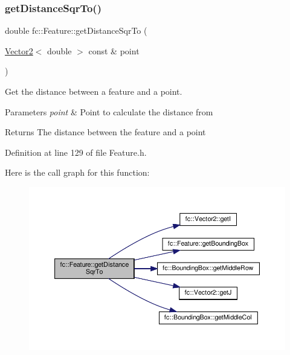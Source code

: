 \subsubsection{\texorpdfstring{get\+Distance\+Sqr\+To()}{getDistanceSqrTo()}}
{\footnotesize\ttfamily double fc\+::\+Feature\+::get\+Distance\+Sqr\+To (\begin{DoxyParamCaption}\item[{\hyperlink{classfc_1_1Vector2}{Vector2}$<$ double $>$ const \&}]{point }\end{DoxyParamCaption})\hspace{0.3cm}{\ttfamily [inline]}}



Get the distance between a feature and a point. 


\begin{DoxyParams}{Parameters}
{\em point} & Point to calculate the distance from \\
\hline
\end{DoxyParams}
\begin{DoxyReturn}{Returns}
The distance between the feature and a point 
\end{DoxyReturn}


Definition at line 129 of file Feature.\+h.

Here is the call graph for this function\+:
\nopagebreak
\begin{figure}[H]
\begin{center}
\leavevmode
\includegraphics[width=350pt]{d7/d71/classfc_1_1Feature_a21626e0da332bd17ef8b50b137c6e696_cgraph}
\end{center}
\end{figure}
\mbox{\label{classfc_1_1Feature_aaca79900d55dd3e037e8edfe36330af0}} 
